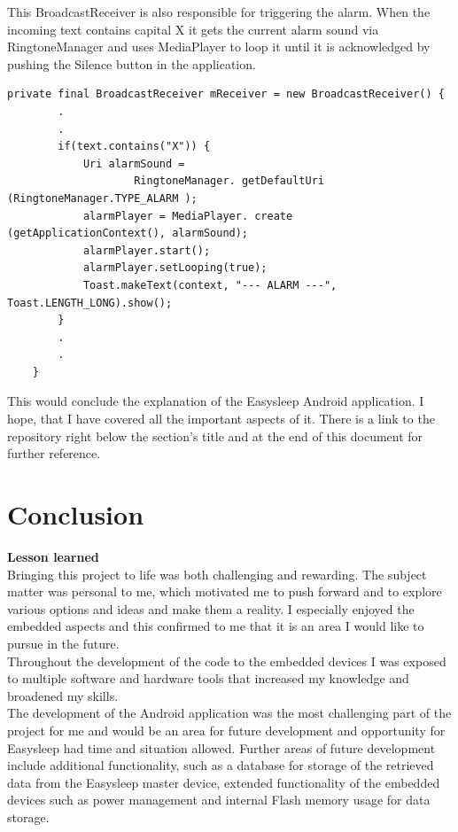 \documentclass[12pt,a4paper]{article}
\begin{document}
    This BroadcastReceiver is also responsible for triggering the alarm. When the incoming text contains capital X it gets the current alarm sound via RingtoneManager and uses MediaPlayer to loop it until it is acknowledged by pushing the Silence button in the application.
    \begin{lstlisting}[label={lst:alarmTrig}, caption=Alarm handling]
    private final BroadcastReceiver mReceiver = new BroadcastReceiver() {
        .
        .
        if(text.contains("X")) {
            Uri alarmSound =
                    RingtoneManager. getDefaultUri (RingtoneManager.TYPE_ALARM );
            alarmPlayer = MediaPlayer. create (getApplicationContext(), alarmSound);
            alarmPlayer.start();
            alarmPlayer.setLooping(true);
            Toast.makeText(context, "--- ALARM ---", Toast.LENGTH_LONG).show();
        }
        .
        .
    }
    \end{lstlisting}

    
    This would conclude the explanation of the Easysleep Android application. I hope, that I have covered all the important aspects of it. There is a link to the repository right below the section's title and at the end of this document for further reference.
    \newpage

    \section{Conclusion}
    {\bfseries Lesson learned}\\
    
    Bringing this project to life was both challenging and rewarding. The subject matter was personal to me, which motivated me to push forward and to explore various options and ideas and make them a reality. I especially enjoyed the embedded aspects and this confirmed to me that it is an area I would like to pursue in the future.\\
    
    Throughout the development of the code to the embedded devices I was exposed to multiple software and hardware tools that increased my knowledge and broadened my skills. \\
    
    The development of the Android application was the most challenging part of the project for me and  would be an area for future development and opportunity for Easysleep had time and situation allowed. Further areas of future development include additional functionality, such as a database for storage of the retrieved data from the Easysleep master device, extended functionality of the embedded devices such as power management and internal Flash memory usage for data storage.
   
\end{document}

